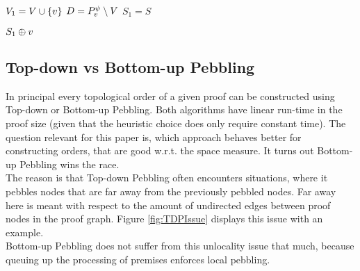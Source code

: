 \documentclass{llncs}
\begin{document}
\begin{algorithm}[h]
	
	$V_1 = V \cup \{v\}$\;
	$D = P_{v}^{\psi} \setminus V$\;
	$S_1 = S$
	
	
	\Return $S_1 \oplus v$\;
	
  \caption[.]{}
  \label{algo:visit}
\end{algorithm}

\subsection{Top-down vs Bottom-up Pebbling} %

\label{sec:TDvsBU}

In principal every topological order of a given proof can be constructed using Top-down or Bottom-up Pebbling.
Both algorithms have linear run-time in the proof size (given that the heuristic choice does only require constant time). 
The question relevant for this paper is, which approach behaves better for constructing orders, that are good w.r.t. the space measure.
It turns out Bottom-up Pebbling wins the race.\\
The reason is that Top-down Pebbling often encounters situations, where it pebbles nodes that are far away from the previously pebbled nodes.
Far away here is meant with respect to the amount of undirected edges between proof nodes in the proof graph. Figure \ref{fig:TDPIssue} displays this issue with an example.\\
Bottom-up Pebbling does not suffer from this unlocality issue that much, because queuing up the processing of premises enforces local pebbling.
\end{document}
